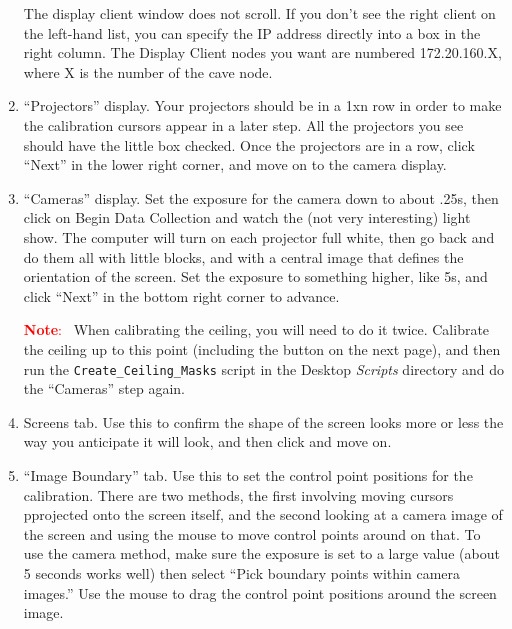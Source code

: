 \documentclass[11pt]{article}
\newenvironment{note}[1][Note]{\begin{lrbox}{\notebox}%
    \begin{minipage}{0.9\columnwidth}\textcolor{red}{\textbf{#1}:~}}%
    {\end{minipage}\end{lrbox}\begin{center}\setlength{\fboxsep}{8pt}%
    \fbox{\usebox{\notebox}}\end{center}}
\newcommand{\cmd}[1]{\texttt{#1}\xspace}
\newcommand{\dir}[1]{\textit{#1}\xspace}
\newcommand{\menu}[1]{``#1''\xspace}
\newcommand{\button}[1]{\framebox{\textsf{#1}\xspace}}
\begin{document}
\begin{enumerate}
The display client window does not scroll.  If you don't see the right
client on the left-hand list, you can specify the IP address directly
into a box in the right column.  The Display Client nodes you want are
numbered 172.20.160.X, where X is the number of the cave node.

\item \menu{Projectors} display.  Your projectors should be in a 1xn row in
  order to make the calibration cursors appear in a later step.  All
  the projectors you see should have the little box checked.  Once the
  projectors are in a row, click
  \menu{Next} in the lower right corner, and move on to the camera
  display.

\item \menu{Cameras} display.  Set the exposure for the camera down to
  about .25s, then click on {Begin Data Collection} and watch the (not
  very interesting) light show.  The computer will turn on each
  projector full white, then go back and do them all with little
  blocks, and with a central image that defines the orientation of the
  screen.  Set the exposure to something higher, like 5s, and click
  ``Next'' in the bottom right corner to advance.

\begin{note}
  When calibrating the ceiling, you will need to do it twice.
  Calibrate the ceiling up to this point (including the \button{Update
    Calibration} button on the next page), and then run the
  \cmd{Create\_Ceiling\_Masks} script in the Desktop \dir{Scripts}
  directory and do the \menu{Cameras} step again.
\end{note}

\item Screens tab.  Use this to confirm the shape of the screen looks
  more or less the way you anticipate it will look, and then click
  \button{Next} and move on.

\item \menu{Image Boundary} tab.  Use this to set the control point
  positions for the calibration.  There are two methods, the first
  involving moving cursors pprojected onto the screen itself, and the second
  looking at a camera image of the screen and using the mouse to move
  control points around on that.  To use the camera method, make sure
  the exposure is set to a large value (about 5 seconds works well) then 
  select ``Pick boundary points within camera images.''  Use the mouse
  to drag the control point positions around the screen image.


\end{enumerate}
\end{document}

